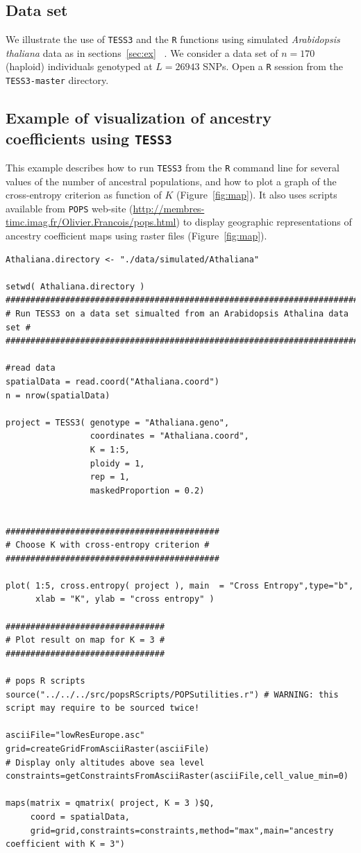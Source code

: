 \documentclass[10pt,a4paper]{article}
\begin{document}
\subsection{Data set}

We illustrate the use of {\tt TESS3} and the {\tt R} functions using simulated {\it Arabidopsis thaliana} data as in sections~\ref{sec:ex} ~\cite{atwell2010genome}. We consider a data set of $n = 170$ (haploid) individuals genotyped at $L = 26943$ SNPs. Open a {\tt R} session from the {\tt TESS3-master} directory.

\subsection{Example of visualization of ancestry coefficients using {\tt TESS3}}\label{sec:struc}

This example describes how to run {\tt TESS3} from the {\tt R} command line for several values of the number of ancestral populations, and how to plot a graph of the cross-entropy criterion as function of $K$ (Figure~\ref{fig:map}). It also uses scripts available from {\tt POPS} web-site (\url{http://membres-timc.imag.fr/Olivier.Francois/pops.html}) to display geographic representations of ancestry coefficient maps using raster files \cite{jay2012forecasting} (Figure~\ref{fig:map}). 

\begin{Verbatim}[frame=single]
Athaliana.directory <- "./data/simulated/Athaliana"

setwd( Athaliana.directory )
###########################################################################
# Run TESS3 on a data set simualted from an Arabidopsis Athalina data set #
###########################################################################

#read data
spatialData = read.coord("Athaliana.coord")
n = nrow(spatialData)

project = TESS3( genotype = "Athaliana.geno", 
                 coordinates = "Athaliana.coord", 
                 K = 1:5, 
                 ploidy = 1, 
                 rep = 1, 
                 maskedProportion = 0.2)


###########################################
# Choose K with cross-entropy criterion #
###########################################

plot( 1:5, cross.entropy( project ), main  = "Cross Entropy",type="b", 
      xlab = "K", ylab = "cross entropy" )

################################
# Plot result on map for K = 3 #
################################

# pops R scripts
source("../../../src/popsRScripts/POPSutilities.r") # WARNING: this 
script may require to be sourced twice!

asciiFile="lowResEurope.asc"
grid=createGridFromAsciiRaster(asciiFile)
# Display only altitudes above sea level
constraints=getConstraintsFromAsciiRaster(asciiFile,cell_value_min=0)

maps(matrix = qmatrix( project, K = 3 )$Q,
     coord = spatialData,
     grid=grid,constraints=constraints,method="max",main="ancestry coefficient with K = 3")
\end{Verbatim}
\end{document}
